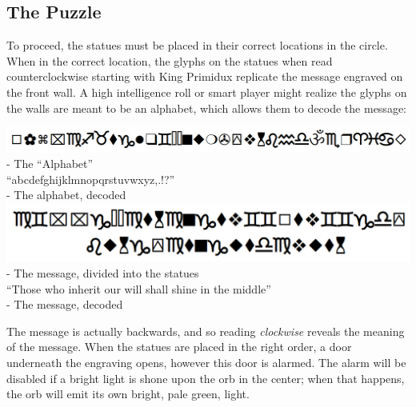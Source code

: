 \subsection{The Puzzle}
To proceed, the statues must be placed in their correct locations in the circle. When in the correct location, the glyphs on the statues when read counterclockwise starting with King Primidux replicate the message engraved on the front wall. A high intelligence roll or smart player might realize the glyphs on the walls are meant to be an alphabet, which allows them to decode the message:
\begin{center}
\includegraphics[scale=0.5]{combats/alphabet.PNG}\\
- The ``Alphabet''\\

``abcdefghijklmnopqrstuvwxyz,.!?''\\
- The alphabet, decoded\\

\includegraphics[scale=0.5]{combats/message.PNG}\\
- The message, divided into the statues \\

``Those who inherit our will shall shine in the middle''\\
- The message, decoded
\end{center}

The message is actually backwards, and so reading \textit{clockwise} reveals the meaning of the message. When the statues are placed in the right order, a door underneath the engraving opens, however this door is alarmed. The alarm will be disabled if a bright light is shone upon the orb in the center; when that happens, the orb will emit its own bright, pale green, light.

